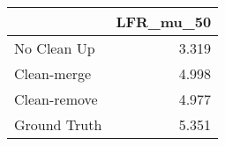 \begin{tabular}{lr}
\toprule
{} & LFR_mu_50 \\
\midrule
No Clean Up  &     3.319 \\
Clean-merge  &     4.998 \\
Clean-remove &     4.977 \\
Ground Truth &     5.351 \\
\bottomrule
\end{tabular}
